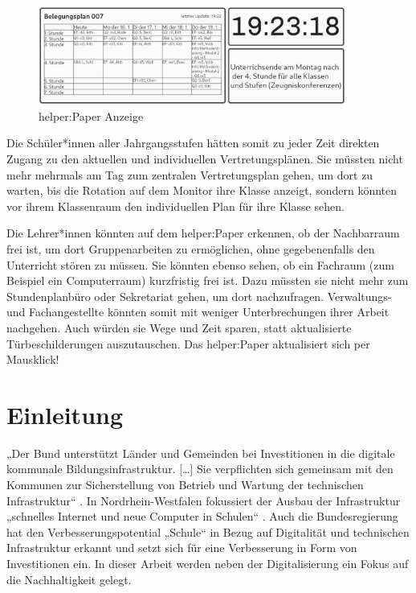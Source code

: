 \documentclass[10pt]{article}
\begin{document}
\begin{figure}[h]
  \centerline{\includegraphics[width=0.9\textwidth]{Screenshot_20230113_192318.png}}
  \caption{helper:Paper Anzeige}
  \label{Vorderseite helper:Paper}
\end{figure}

Die Schüler*innen aller Jahrgangsstufen hätten somit zu jeder Zeit direkten Zugang zu den aktuellen und individuellen Vertretungsplänen. Sie müssten nicht mehr mehrmals am Tag zum zentralen Vertretungsplan gehen, um dort zu warten, bis die Rotation auf dem Monitor ihre Klasse anzeigt, sondern könnten vor ihrem Klassenraum den individuellen Plan für ihre Klasse sehen.

Die Lehrer*innen könnten auf dem helper:Paper erkennen, ob der Nachbarraum frei ist, um dort Gruppenarbeiten zu ermöglichen, ohne gegebenenfalls den Unterricht stören zu müssen. Sie könnten ebenso sehen, ob ein Fachraum (zum Beispiel ein Computerraum) kurzfristig frei ist. Dazu müssten sie nicht mehr zum Stundenplanbüro oder Sekretariat gehen, um dort nachzufragen. Verwaltungs- und Fachangestellte könnten somit mit weniger Unterbrechungen ihrer Arbeit nachgehen. Auch würden sie Wege und Zeit sparen, statt aktualisierte Türbeschilderungen auszutauschen. Das helper:Paper aktualisiert sich per Mausklick!
\clearpage
{}
\setcounter{page}{1}
\section{Einleitung} 
„Der Bund unterstützt Länder und Gemeinden bei Investitionen in die digitale kommunale Bildungsinfrastruktur. […] Sie verpflichten sich gemeinsam mit den Kommunen zur Sicherstellung von Betrieb und Wartung der technischen Infrastruktur“ \cite{Digitalisierung}. 
In Nordrhein-Westfalen fokussiert der Ausbau der Infrastruktur „schnelles Internet und neue Computer in Schulen“ \cite{Digitalisierung}.
Auch die Bundesregierung hat den Verbesserungspotential „Schule“ in Bezug auf Digitalität und technischen Infrastruktur erkannt und setzt sich für eine Verbesserung in Form von Investitionen ein. In dieser Arbeit werden neben der Digitalisierung ein Fokus auf die Nachhaltigkeit gelegt.
\end{document}
